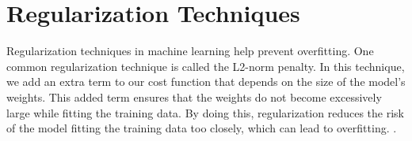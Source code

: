 \documentclass[a4paper, UKenglish, 11pt]{uiomaster}
\begin{document}
%
%
%
%
%
%
%





\section{Regularization Techniques}
Regularization techniques in machine learning help prevent overfitting. One common regularization technique is called the L2-norm penalty. In this technique, we add an extra term to our cost function that depends on the size of the model's weights. This added term ensures that the weights do not become excessively large while fitting the training data. By doing this, regularization reduces the risk of the model fitting the training data too closely, which can lead to overfitting. \cite{Hjorth-Jensen2022}.
\end{document}
